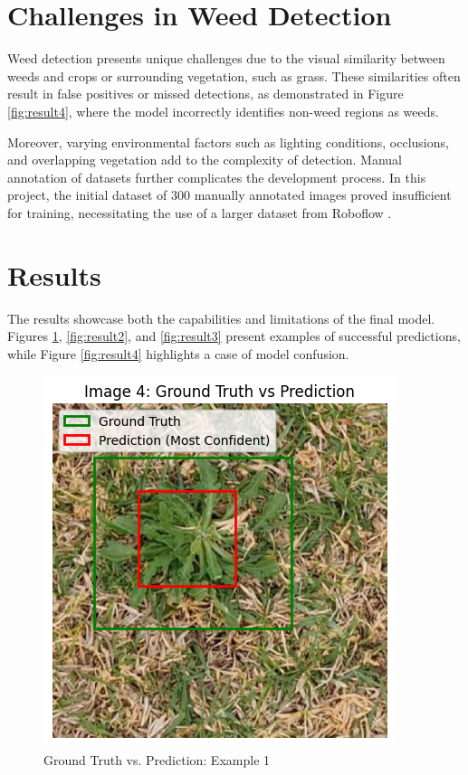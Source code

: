 \documentclass[conference]{IEEEtran}
\begin{document}
\section{Challenges in Weed Detection}
Weed detection presents unique challenges due to the visual similarity between weeds and crops or surrounding vegetation, such as grass. These similarities often result in false positives or missed detections, as demonstrated in Figure \ref{fig:result4}, where the model incorrectly identifies non-weed regions as weeds.

Moreover, varying environmental factors such as lighting conditions, occlusions, and overlapping vegetation add to the complexity of detection. Manual annotation of datasets further complicates the development process. In this project, the initial dataset of 300 manually annotated images proved insufficient for training, necessitating the use of a larger dataset from Roboflow \cite{ahmed2024imageweed}.

\section{Results}
The results showcase both the capabilities and limitations of the final model. Figures \ref{fig:result1}, \ref{fig:result2}, and \ref{fig:result3} present examples of successful predictions, while Figure \ref{fig:result4} highlights a case of model confusion.

\begin{figure}[H]
    \centering
    \includegraphics[width=\columnwidth]{result1.png}
    \caption{Ground Truth vs. Prediction: Example 1}
    \label{fig:result1}
\end{figure}
\end{document}
